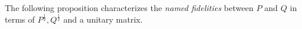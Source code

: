 \documentclass[12pt]{article}
\newtheorem{cor}[theorem]{Corollary} %
\theoremstyle{definition}
\begin{document}


The following proposition characterizes the \textit{named fidelities} between $P$ and $Q$ in terms of $P^{\frac 12}, Q^{\frac 12}$ and a unitary matrix.
\end{document}
